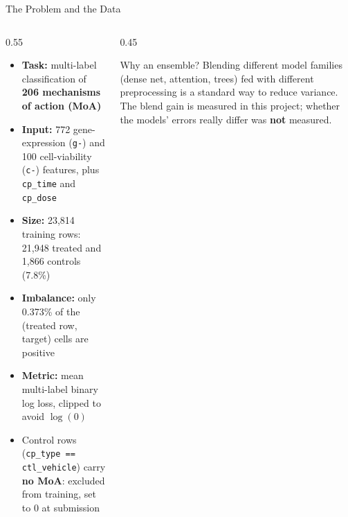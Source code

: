 \documentclass[9pt,aspectratio=169]{beamer}
\begin{document}
\begin{frame}{The Problem and the Data}
  \begin{columns}[T]
    \begin{column}{0.55\textwidth}
      \begin{itemize}
        \item \textbf{Task:} multi-label classification of \textbf{206 mechanisms of action (MoA)}
        \item \textbf{Input:} 772 gene-expression (\texttt{g-}) and 100 cell-viability (\texttt{c-}) features, plus \texttt{cp\_time} and \texttt{cp\_dose}
        \item \textbf{Size:} 23,814 training rows: 21,948 treated and 1,866 controls (7.8\%)
        \item \textbf{Imbalance:} only 0.373\% of the (treated row, target) cells are positive
        \item \textbf{Metric:} mean multi-label binary log loss, clipped to avoid $\log(0)$
        \item Control rows (\texttt{cp\_type == ctl\_vehicle}) carry \textbf{no MoA}: excluded from training, set to 0 at submission
      \end{itemize}
    \end{column}
    \begin{column}{0.45\textwidth}
      \begin{block}{Why an ensemble?}
        Blending different model families (dense net, attention, trees) fed with different preprocessing is a standard way to reduce variance. The blend gain is measured in this project; whether the models' errors really differ was \textbf{not} measured.
      \end{block}
    \end{column}
  \end{columns}
\end{frame}
\end{document}
